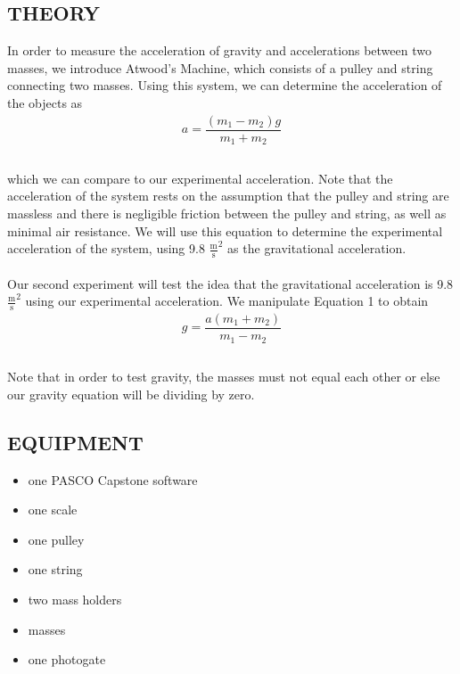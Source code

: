 \documentclass [12pt, letterpaper, twoside] {article}
\begin{document}
\subsection* {THEORY}
\noindent
In order to measure the acceleration of gravity and accelerations between two masses, we introduce Atwood's Machine, which consists of a pulley and string connecting two masses. Using this system, we can determine the acceleration of the objects as \\
\begin {equation}
  \begin {split}
    a = \dfrac{(m_{1}-m_{2})g}{m_{1}+m_{2}} \\
  \end {split}
\end {equation} \\
which we can compare to our experimental acceleration.
Note that the acceleration of the system rests on the assumption that the pulley and string are massless and there is negligible friction between the pulley and string, as well as minimal air resistance. We will use this equation to determine the experimental acceleration of the system, using 9.8 \(\tfrac{\text{m}}{\text{s}}^2\) as the gravitational acceleration. \\\\
Our second experiment will test the idea that the gravitational acceleration is 9.8 \(\tfrac{\text{m}}{\text{s}}^2\) using our experimental acceleration. We manipulate Equation 1 to obtain \\
\begin {equation}
  \begin {split}
    g = \dfrac{a(m_{1}+m_{2})}{m_{1}-m_{2}} \\
  \end {split}
\end {equation} \\
Note that in order to test gravity, the masses must not equal each other or else our gravity equation will be dividing by zero.

\subsection* {EQUIPMENT}
  \noindent
  \begin {itemize}
    \itemsep0em
    \item {one PASCO Capstone software}
    \item {one scale}
    \item {one pulley}
    \item {one string}
    \item {two mass holders}
    \item {masses}
    \item {one photogate}
  \end {itemize}
\end{document}
